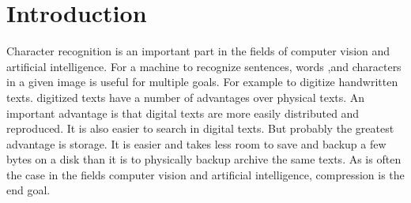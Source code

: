 \section{Introduction} %
\label{sec:introduction}






















Character recognition is an important part in the fields of computer vision and artificial intelligence. For a machine to recognize sentences, words ,and characters in a given image is useful for multiple goals. For example to digitize handwritten texts. digitized texts have a number of advantages over physical texts. An important advantage is that digital texts are more easily distributed and reproduced. It is also easier to search in digital texts. But probably the greatest advantage is storage. It is easier and takes less room to save and backup a few bytes on a disk than it is to physically backup archive the same texts. As is often the case in the fields computer vision and artificial intelligence, compression is the end goal.

